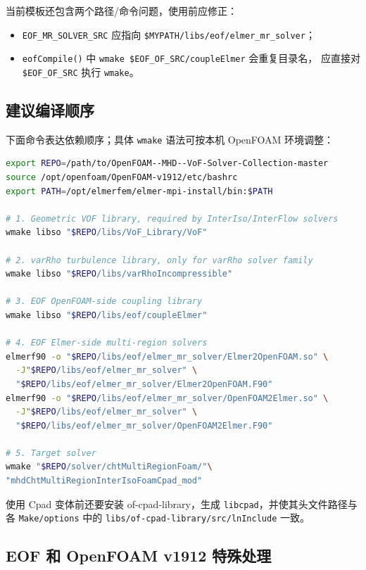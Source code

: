 \documentclass[11pt,a4paper]{article}
\begin{document}
当前模板还包含两个路径/命令问题，使用前应修正：
\begin{itemize}
    \item \texttt{EOF\_MR\_SOLVER\_SRC} 应指向
    \texttt{\$MYPATH/libs/eof/elmer\_mr\_solver}；
    \item \texttt{eofCompile()} 中
    \texttt{wmake \$EOF\_OF\_SRC/coupleElmer} 会重复目录名，
    应直接对 \texttt{\$EOF\_OF\_SRC} 执行 \texttt{wmake}。
\end{itemize}

\subsection{建议编译顺序}

下面命令表达依赖顺序；具体 \texttt{wmake} 语法可按本机 OpenFOAM
环境调整：

\begin{lstlisting}[style=cppstyle, language=bash]
export REPO=/path/to/OpenFOAM--MHD--VoF-Solver-Collection-master
source /opt/openfoam/OpenFOAM-v1912/etc/bashrc
export PATH=/opt/elmerfem/elmer-mpi-install/bin:$PATH

# 1. Geometric VOF library, required by InterIso/InterFlow solvers
wmake libso "$REPO/libs/VoF_Library/VoF"

# 2. varRho turbulence library, only for varRho solver family
wmake libso "$REPO/libs/varRhoIncompressible"

# 3. EOF OpenFOAM-side coupling library
wmake libso "$REPO/libs/eof/coupleElmer"

# 4. EOF Elmer-side multi-region solvers
elmerf90 -o "$REPO/libs/eof/elmer_mr_solver/Elmer2OpenFOAM.so" \
  -J"$REPO/libs/eof/elmer_mr_solver" \
  "$REPO/libs/eof/elmer_mr_solver/Elmer2OpenFOAM.F90"
elmerf90 -o "$REPO/libs/eof/elmer_mr_solver/OpenFOAM2Elmer.so" \
  -J"$REPO/libs/eof/elmer_mr_solver" \
  "$REPO/libs/eof/elmer_mr_solver/OpenFOAM2Elmer.F90"

# 5. Target solver
wmake "$REPO/solver/chtMultiRegionFoam/"\
"mhdChtMultiRegionInterIsoFoamCpad_mod"
\end{lstlisting}

使用 Cpad 变体前还要安装 of-cpad-library，生成
\texttt{libcpad}，并使其头文件路径与各 \texttt{Make/options} 中的
\texttt{libs/of-cpad-library/src/lnInclude} 一致。

\subsection{EOF 和 OpenFOAM v1912 特殊处理}
\end{document}
